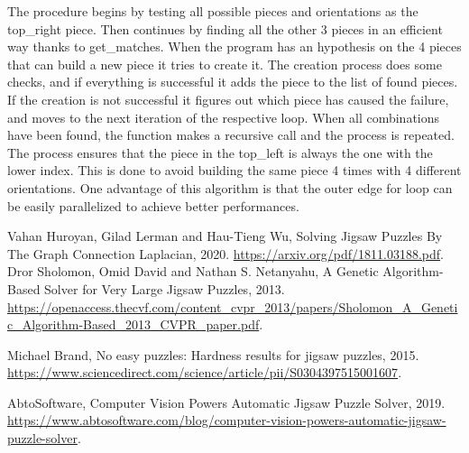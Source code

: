 \documentclass{article}
\begin{document}
The procedure begins by testing all possible pieces and orientations as the top\_right piece.
Then continues by finding all the other 3 pieces in an efficient way thanks to get\_matches.
When the program has an hypothesis on the 4 pieces that can build a new piece it tries to create it.\newline
The creation process does some checks, and if everything is successful it adds the piece to the list of found pieces.
If the creation is not successful it figures out which piece has caused the failure, and moves to the next iteration of the respective loop.\newline
When all combinations have been found, the function makes a recursive call and the process is repeated.\newline
The process ensures that the piece in the top\_left is always the one with the lower index.
This is done to avoid building the same piece 4 times with 4 different orientations.\newline
One advantage of this algorithm is that the outer edge for loop can be easily parallelized to achieve better performances.



\clearpage
\begin{thebibliography}{9}

    Vahan Huroyan, Gilad   Lerman and Hau-Tieng Wu,
    Solving Jigsaw Puzzles By The Graph Connection Laplacian,
    2020.
    \url{https://arxiv.org/pdf/1811.03188.pdf}.
    Dror Sholomon, Omid David and Nathan S. Netanyahu,
    A Genetic Algorithm-Based Solver for Very Large Jigsaw Puzzles,
    2013.
    \url{https://openaccess.thecvf.com/content_cvpr_2013/papers/Sholomon_A_Genetic_Algorithm-Based_2013_CVPR_paper.pdf}.
  
    Michael Brand,
    No easy puzzles: Hardness results for jigsaw puzzles,
    2015.
    \url{https://www.sciencedirect.com/science/article/pii/S0304397515001607}.

    AbtoSoftware,
    Computer Vision Powers Automatic Jigsaw Puzzle Solver,
    2019.
    \url{https://www.abtosoftware.com/blog/computer-vision-powers-automatic-jigsaw-puzzle-solver}.
  
\end{thebibliography}
\end{document}
